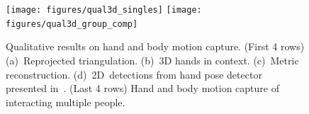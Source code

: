 \begin{figure}[h]
	\centering
	\texttt{[image: figures/qual3d\_singles]}
	\texttt{[image: figures/qual3d\_group\_comp]}
	\caption{Qualitative results on hand and body motion capture. (First 4 rows) (a)~Reprojected triangulation. (b)~3D hands in context. (c)~Metric reconstruction. (d)~2D~detections from hand pose detector presented in~\cite{simon2017hand}. (Last 4 rows) Hand and body motion capture of interacting multiple people.}
	\label{fig:qualitativeHandCaptureGroup}
\end{figure}

